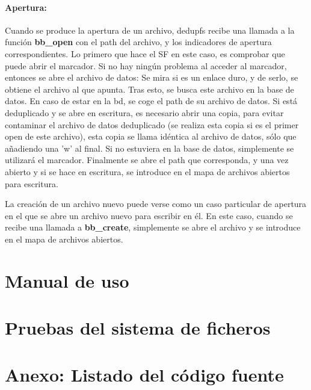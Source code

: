 \documentclass[12pt,a4paper]{article}
\begin{document}
\paragraph{Apertura:}
Cuando se produce la apertura de un archivo, dedupfs recibe una llamada a la función \textbf{bb\_open} con el path del archivo, y los indicadores de apertura correspondientes. Lo primero que hace el SF en este caso, es comprobar que puede abrir el marcador. Si no hay ningún problema al acceder al marcador, entonces se abre el archivo de datos: Se mira si es un enlace duro, y de serlo, se obtiene el archivo al que apunta. Tras esto, se busca este archivo en la base de datos. En caso de estar en la bd, se coge el path de su archivo de datos. Si está deduplicado y se abre en escritura, es necesario abrir una copia, para evitar contaminar el archivo de datos deduplicado (se realiza esta copia si es el primer open de este archivo), esta copia se llama idéntica al archivo de datos, sólo que añadiendo una 'w' al final.
Si no estuviera en la base de datos, simplemente se utilizará el marcador.
Finalmente se abre el path que corresponda, y una vez abierto y si se hace en escritura, se introduce en el mapa de archivos abiertos para escritura.

La creación de un archivo nuevo puede verse como un caso particular de apertura en el que se abre un archivo nuevo para escribir en él. En este caso, cuando se recibe una llamada a \textbf{bb\_create}, simplemente se abre el archivo y se introduce en el mapa de archivos abiertos.


\newpage
\section{Manual de uso}

\newpage
\section{Pruebas del sistema de ficheros}


\newpage
\section{Anexo: Listado del código fuente}

\iffalse 
\begin{figure}[h!]
  \centering
  \label{fig:supervisiontree}
  \texttt{[image: supervisiontree]}
  \caption{Árbol de supervisión}
\end{figure}
\fi


\iffalse
\lstdefinestyle{mystyle}{language=Pascal,
  breakatwhitespace=false,
  breaklines=true,
  basicstyle=\footnotesize
}
\begin{mycode}
1> application:start(otpapp).
Iniciado supervisor s1
Iniciado supervisor s2
Iniciado worker w2A 
Iniciado worker w2B 
Iniciado supervisor s3
Iniciado worker w3A 
Iniciado supervisor s5
Iniciado worker w5A 
Iniciado worker w5B 
Iniciado worker w5C 
Iniciado supervisor s4
Iniciado worker w4A 
Iniciado worker w4B 
ok
\end{mycode}
\fi
\end{document}
